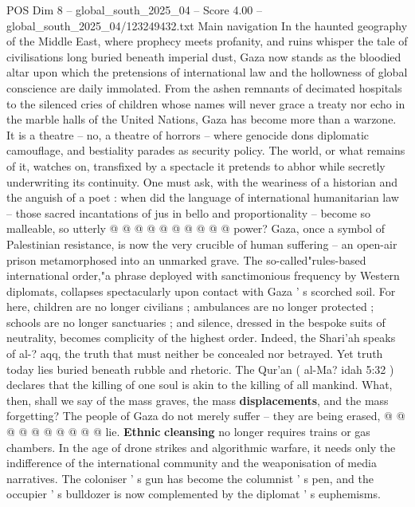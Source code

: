 \begin{textsample}{POS Dim 8 – global\_south\_2025\_04 – Score 4.00 – global\_south\_2025\_04/123249432.txt}  \label{ex:f8_pos_166}
Main navigation In the haunted geography of the Middle East, where prophecy meets profanity, and ruins whisper the tale of civilisations long buried beneath imperial dust, Gaza now stands as the bloodied altar upon which the pretensions of international law and the hollowness of global conscience are daily immolated.
From the ashen remnants of decimated hospitals to the silenced cries of children whose names will never grace a treaty nor echo in the marble halls of the United Nations, Gaza has become more than a warzone.
It is a theatre -- no, a theatre of horrors -- where genocide dons diplomatic camouflage, and bestiality parades as security policy.
The world, or what remains of it, watches on, transfixed by a spectacle it pretends to abhor while secretly underwriting its continuity.
One must ask, with the weariness of a historian and the anguish of a poet : when did the language of international humanitarian law -- those sacred incantations of jus in bello and proportionality -- become so malleable, so utterly @ @ @ @ @ @ @ @ @ @ power?
Gaza, once a symbol of Palestinian resistance, is now the very crucible of human suffering -- an open-air prison metamorphosed into an unmarked grave.
The so-called"rules-based international order,"a phrase deployed with sanctimonious frequency by Western diplomats, collapses spectacularly upon contact with Gaza ' s scorched soil.
For here, children are no longer civilians ; ambulances are no longer protected ; schools are no longer sanctuaries ; and silence, dressed in the bespoke suits of neutrality, becomes complicity of the highest order.
Indeed, the Shari'ah speaks of al-? aqq, the truth that must neither be concealed nor betrayed.
Yet truth today lies buried beneath rubble and rhetoric.
The Qur'an ( al-Ma? idah 5:32 ) declares that the killing of one soul is akin to the killing of all mankind.
What, then, shall we say of the mass graves, the mass \textbf{displacements}, and the mass forgetting?
The people of Gaza do not merely suffer -- they are being erased, @ @ @ @ @ @ @ @ @ @ lie. \textbf{Ethnic} \textbf{cleansing} no longer requires trains or gas chambers.
In the age of drone strikes and algorithmic warfare, it needs only the indifference of the international community and the weaponisation of media narratives.
The coloniser ' s gun has become the columnist ' s pen, and the occupier ' s bulldozer is now complemented by the diplomat ' s euphemisms.

\end{textsample}
